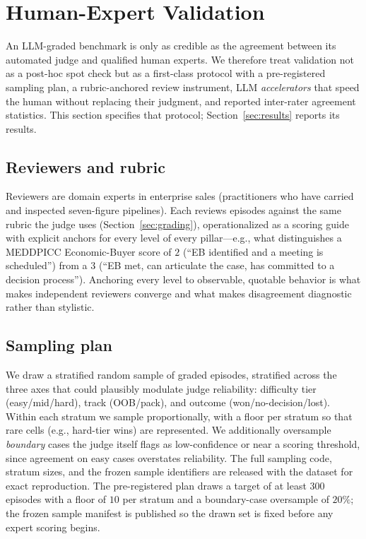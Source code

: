\section{Human-Expert Validation}
\label{sec:validation}

An LLM-graded benchmark is only as credible as the agreement between its automated
judge and qualified human experts. We therefore treat validation not as a
post-hoc spot check but as a first-class protocol with a pre-registered sampling
plan, a rubric-anchored review instrument, LLM \emph{accelerators} that speed the
human without replacing their judgment, and reported inter-rater agreement
statistics. This section specifies that protocol; Section~\ref{sec:results}
reports its results.

\subsection{Reviewers and rubric}
Reviewers are domain experts in enterprise sales (practitioners who have carried
and inspected seven-figure pipelines). Each reviews episodes against the same
rubric the judge uses (Section~\ref{sec:grading}), operationalized as a scoring
guide with explicit anchors for every level of every pillar---e.g., what
distinguishes a MEDDPICC Economic-Buyer score of $2$ (``EB identified and a
meeting is scheduled'') from a $3$ (``EB met, can articulate the case, has
committed to a decision process''). Anchoring every level to observable,
quotable behavior is what makes independent reviewers converge and what makes
disagreement diagnostic rather than stylistic.

\subsection{Sampling plan}
We draw a stratified random sample of graded episodes, stratified across the three
axes that could plausibly modulate judge reliability: difficulty tier
(easy/mid/hard), track (OOB/pack), and outcome (won/no-decision/lost). Within each
stratum we sample proportionally, with a floor per stratum so that rare cells
(e.g., hard-tier wins) are represented. We additionally oversample \emph{boundary}
cases the judge itself flags as low-confidence or near a scoring threshold, since
agreement on easy cases overstates reliability. The full sampling code, stratum
sizes, and the frozen sample identifiers are released with the dataset for exact
reproduction. The pre-registered plan draws a target of at least $300$ episodes
with a floor of $10$ per stratum and a boundary-case oversample of $20\%$; the
frozen sample manifest is published so the drawn set is fixed before any expert
scoring begins.

